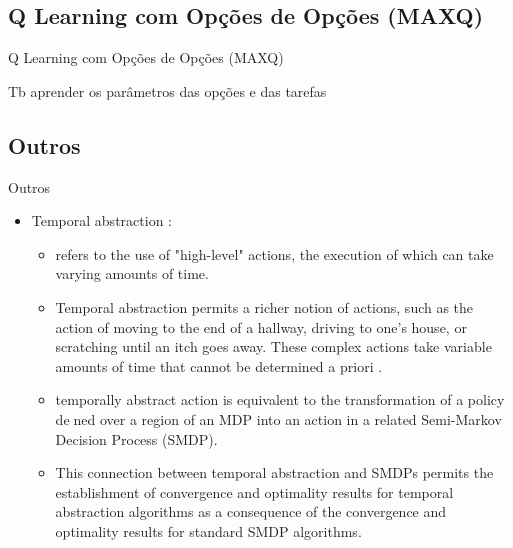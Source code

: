 \subsection{Q Learning com Opções de Opções (MAXQ)}
\begin{frame}{Q Learning com Opções de Opções (MAXQ)}
    
\end{frame}

\begin{frame}{Tb aprender os parâmetros das opções e das tarefas}
    
\end{frame}

\subsection{Outros}
\begin{frame}{Outros}
    \begin{itemize}
        \item Temporal abstraction  \nocite{thesis600}:
        \begin{itemize}
            \item refers to the use of "high-level" actions, the execution of
which can take varying amounts of time.
            \item Temporal abstraction permits a richer notion of actions, such as the action of moving to the end of a hallway, driving to one's house, or scratching until an itch goes away. These complex actions take variable amounts of time that cannot be determined a priori .
            \item temporally abstract action is equivalent to the transformation of a policy dened over a region of an MDP into an action in a related Semi-Markov Decision Process (SMDP).
            \item This connection between temporal abstraction and SMDPs permits the establishment of convergence and optimality results for temporal abstraction algorithms as a consequence of the convergence and optimality results for standard SMDP algorithms.
        \end{itemize}
    \end{itemize}    
\end{frame}




